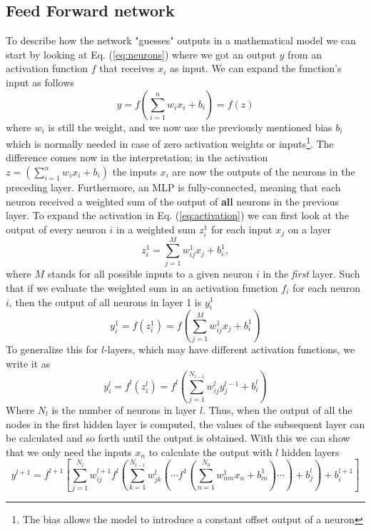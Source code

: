 \documentclass[12pt, a4paper]{book}
\begin{document}
\subsection{Feed Forward network}\label{sec:FFN}
To describe how the network "guesses" outputs in a mathematical model we can start by looking at Eq. (\ref{eq:neurons}) where we got an output $y$ from an activation function $f$ that receives $x_i$ as input. 
We can expand the function's input as follows
\begin{equation}\label{eq:activation}
    y=f\left(\sum_{i=1}^nw_ix_i+b_i\right)=f(z)
\end{equation} 
where $w_i$ is still the weight, and we now use the previously mentioned bias $b_i$ which is normally needed in case of zero activation weights or inputs\footnote{The bias allows the model to introduce a constant offset output of a neuron}. The difference comes now in the interpretation; in the activation 
$z=(\sum_{i=1}^nw_ix_i+b_i)$ the inputs $x_i$ are now the outputs of the neurons in the preceding layer. Furthermore, an MLP is fully-connected, meaning that each neuron received a weighted sum of the output of \textbf{all} 
neurons in the previous layer. To expand the activation in Eq. (\ref{eq:activation}) we can first look at the output of every neuron $i$ in a weighted sum $z^1_i$ for each input $x_j$ on a layer
\begin{equation}\label{eq:weightedsum}
    z_i^1=\sum_{j=1}^Mw_{ij}^1x_j + b^1_i,
\end{equation}
where $M$ stands for all possible inputs to a given neuron $i$ in the \textit{first} layer. Such that if we evaluate the weighted sum in an activation function $f_i$ for each neuron $i$, 
then the output of all neurons in layer 1 is $y_i^1$
$$
    y^1_i=f(z_i^1)=f\left(\sum_{j=1}^Mw_{ij}^1x_j + b^1_i\right)
$$
To generalize this for $l$-layers, which may have different activation functions, we write it as
\begin{equation}\label{eq:5.8}
    y^l_i=f^l(z_i^l)=f^l\left(\sum_{j=1}^{N_{l-1}}w_{ij}^ly^{l-1}_j + b^l_i\right)
\end{equation}
Where $N_l$ is the number of neurons in layer $l$. Thus, when the output of all the nodes in the first hidden layer is computed, the values of the subsequent layer can be calculated and so forth until the output is obtained. 
With this we can show that we only need the inputs $x_n$ to calculate the output with $l$ hidden layers
\begin{equation}\label{eq:MLP}
    y^{l+1}=f^{l+1}\left[\sum_{j=1}^{N_l}w^{l+1}_{ij}f^l\left(\sum_{k=1}^{N_{l-1}}w^{l}_{jk}\left(\cdots f^{1}\left(\sum_{n=1}^{N_0}w^1_{mn}x_n+b_m^1\right)\cdots\right)+b_j^{l}\right)+b^{l+1}_i   \right]
\end{equation}
\end{document}
